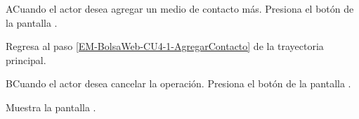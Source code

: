 \begin{UCtrayectoriaA}{A}{Cuando el actor desea agregar un medio de contacto más.}
	\UCpaso [\UCactor] Presiona el botón \IUbutton{+} de la pantalla . 

	\UCpaso Regresa al paso \ref{EM-BolsaWeb-CU4-1-AgregarContacto} de la trayectoria principal.
\end{UCtrayectoriaA}

\begin{UCtrayectoriaA}{B}{Cuando el actor desea cancelar la operación.}
	\UCpaso [\UCactor] Presiona el botón  de la pantalla . 

	\UCpaso Muestra la pantalla .
\end{UCtrayectoriaA}


